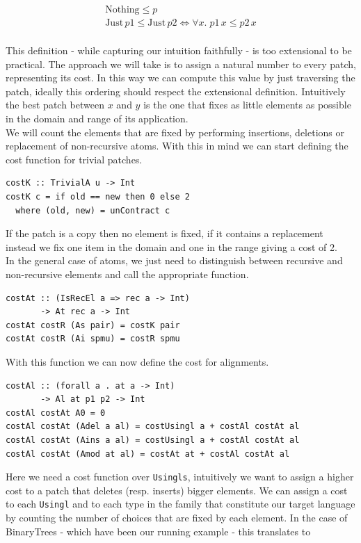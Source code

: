 \documentclass[11pt, titlepage]{article}
\newcommand{\toHaskell}[1]{\texttt{#1}\xspace}
\begin{document}
\begin{center}
\begin{align*}
\mathrm{Nothing} \leq p \\
\mathrm{Just} \, p1 \leq \mathrm{Just} \, p2 \iff  \forall x . \; p1 \, x \leq  p2 \, x \\
\end{align*}
\end{center}
This definition - while capturing our intuition faithfully - is too extensional to be practical. The approach we will take is to assign a natural number to every patch, representing its cost. In this way we can compute this value by just traversing the patch, ideally this ordering should respect the extensional definition. Intuitively the best patch between $x$ and $y$ is the one that fixes as little elements as possible in the domain and range of its application.
\\
We will count the elements that are fixed by performing insertions, deletions or replacement of non-recursive atoms. 
With this in mind we can start defining the cost function for trivial patches.

\begin{verbatim}
costK :: TrivialA u -> Int
costK c = if old == new then 0 else 2
  where (old, new) = unContract c
\end{verbatim}

If the patch is a copy then no element is fixed, if it contains a replacement instead we fix one item in the domain and one in the range giving a cost of 2.
\\
In the general case of atoms, we just need to distinguish between recursive and non-recursive elements and call the appropriate function.

\begin{verbatim}
costAt :: (IsRecEl a => rec a -> Int)
       -> At rec a -> Int
costAt costR (As pair) = costK pair
costAt costR (Ai spmu) = costR spmu
\end{verbatim}
With this function we can now define the cost for alignments.

\begin{verbatim}
costAl :: (forall a . at a -> Int)
       -> Al at p1 p2 -> Int
costAl costAt A0 = 0
costAl costAt (Adel a al) = costUsingl a + costAl costAt al
costAl costAt (Ains a al) = costUsingl a + costAl costAt al
costAl costAt (Amod at al) = costAt at + costAl costAt al
\end{verbatim}

Here we need a cost function over \toHaskell{Usingls}, intuitively we want to assign a higher cost to a patch that deletes (resp. inserts) bigger elements. We can assign a cost to each \toHaskell{Usingl} and to each type in the family that constitute our target language by counting the number of choices that are fixed by each element. In the case of BinaryTrees - which have been our running example - this translates to
\end{document}
